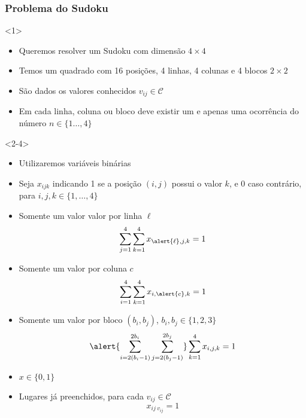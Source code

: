 \documentclass[10pt]{beamer}
\begin{document}
\begin{frame}
  \frametitle{Problema do Sudoku}

  \begin{onlyenv}<1>
    \begin{itemize}
    \item Queremos resolver um Sudoku com dimensão $4 \times 4$
    \item Temos um quadrado com 16 posições, 4 linhas, 4 colunas e 4
      blocos $2 \times 2$
    \item São dados os valores conhecidos $v_{ij} \in \mathcal{C}$
    \item Em cada linha, coluna ou bloco deve existir um e apenas uma
      ocorrência do número $n \in \{1 \dots, 4\}$
    \end{itemize}
  \end{onlyenv}

  \begin{onlyenv}<2-4>
    \begin{itemize}
    \item<only@2> Utilizaremos variáveis binárias
    \item<only@2> Seja $x_{ijk}$ indicando 1 se a posição $(i, j)$ possui o
      valor $k$, e 0 caso contrário, para $i, j, k \in \{1, \dots, 4\}$
    \item<only@3> Somente um valor valor por linha $\ell$
      \[
        \sum_{j = 1}^4 \sum_{k = 1}^4 x_{\alert{\ell}, j, k} = 1
      \]
    \item<only@3> Somente um valor por coluna $c$
      \[
        \sum_{i = 1}^4 \sum_{k = 1}^4 x_{i, \alert{c}, k} = 1
      \]
    \item<only@3> Somente um valor por bloco $(b_i, b_j)$, $b_i, b_j \in \{1, 2, 3\}$
      \[
        \alert{\sum_{i = 2(b_i - 1)}^{2b_i} \sum_{j = 2(b_j - 1)}^{2b_j}} \sum_{k = 1}^4 x_{i, j, k} = 1
      \]
    \item<only@4> $x \in \{0, 1\}$

    \item<only@4> Lugares já preenchidos, para cada
      $v_{ij} \in \mathcal{C}$
      \[
        x_{ij\ v_{ij}} = 1
      \]
    \end{itemize}
  \end{onlyenv}

\end{frame}
\end{document}
